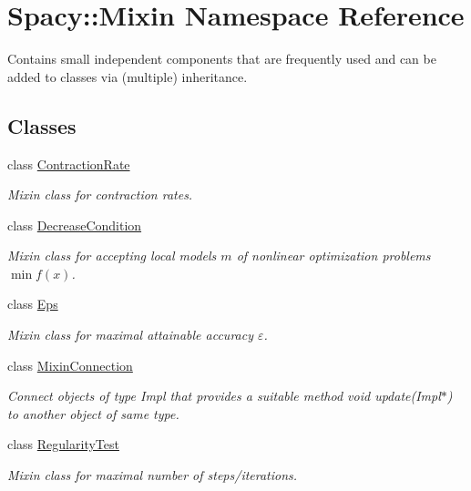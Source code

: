 \hypertarget{namespaceSpacy_1_1Mixin}{\section{\-Spacy\-:\-:\-Mixin \-Namespace \-Reference}
\label{namespaceSpacy_1_1Mixin}
}


\-Contains small independent components that are frequently used and can be added to classes via (multiple) inheritance.  


\subsection*{\-Classes}
\begin{DoxyCompactItemize}
\item 
class \hyperlink{classSpacy_1_1Mixin_1_1ContractionRate}{\-Contraction\-Rate}
\begin{DoxyCompactList}\small\item\em \-Mixin class for contraction rates. \end{DoxyCompactList}\item 
class \hyperlink{classSpacy_1_1Mixin_1_1DecreaseCondition}{\-Decrease\-Condition}
\begin{DoxyCompactList}\small\item\em \-Mixin class for accepting local models $m$ of nonlinear optimization problems $\min f(x)$. \end{DoxyCompactList}\item 
class \hyperlink{classSpacy_1_1Mixin_1_1Eps}{\-Eps}
\begin{DoxyCompactList}\small\item\em \-Mixin class for maximal attainable accuracy $\varepsilon$. \end{DoxyCompactList}\item 
class \hyperlink{classSpacy_1_1Mixin_1_1MixinConnection}{\-Mixin\-Connection}
\begin{DoxyCompactList}\small\item\em \-Connect objects of type \-Impl that provides a suitable method void update(\-Impl$\ast$) to another object of same type. \end{DoxyCompactList}\item 
class \hyperlink{classSpacy_1_1Mixin_1_1RegularityTest}{\-Regularity\-Test}
\begin{DoxyCompactList}\small\item\em \-Mixin class for maximal number of steps/iterations. \end{DoxyCompactList}\item 

\end{DoxyCompactItemize}
